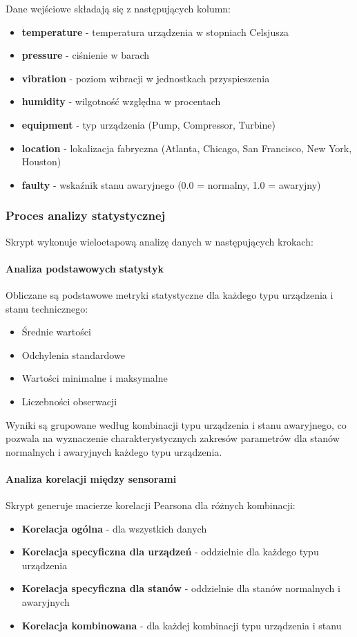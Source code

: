 Dane wejściowe składają się z następujących kolumn:
\begin{itemize}
    \item \textbf{temperature} - temperatura urządzenia w stopniach Celsjusza
    \item \textbf{pressure} - ciśnienie w barach
    \item \textbf{vibration} - poziom wibracji w jednostkach przyspieszenia
    \item \textbf{humidity} - wilgotność względna w procentach
    \item \textbf{equipment} - typ urządzenia (Pump, Compressor, Turbine)
    \item \textbf{location} - lokalizacja fabryczna (Atlanta, Chicago, San Francisco, New York, Houston)
    \item \textbf{faulty} - wskaźnik stanu awaryjnego (0.0 = normalny, 1.0 = awaryjny)
\end{itemize}

\subsubsection{Proces analizy statystycznej}

Skrypt wykonuje wieloetapową analizę danych w następujących krokach:

\paragraph{Analiza podstawowych statystyk}
Obliczane są podstawowe metryki statystyczne dla każdego typu urządzenia i stanu technicznego:
\begin{itemize}
    \item Średnie wartości
    \item Odchylenia standardowe
    \item Wartości minimalne i maksymalne
    \item Liczebności obserwacji
\end{itemize}

Wyniki są grupowane według kombinacji typu urządzenia i stanu awaryjnego, co pozwala na wyznaczenie charakterystycznych zakresów parametrów dla stanów normalnych i awaryjnych każdego typu urządzenia.

\paragraph{Analiza korelacji między sensorami}
Skrypt generuje macierze korelacji Pearsona dla różnych kombinacji:
\begin{itemize}
    \item \textbf{Korelacja ogólna} - dla wszystkich danych
    \item \textbf{Korelacja specyficzna dla urządzeń} - oddzielnie dla każdego typu urządzenia
    \item \textbf{Korelacja specyficzna dla stanów} - oddzielnie dla stanów normalnych i awaryjnych
    \item \textbf{Korelacja kombinowana} - dla każdej kombinacji typu urządzenia i stanu
\end{itemize}

